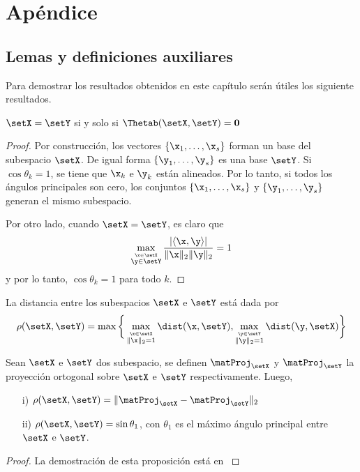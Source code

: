 	
	   \newpage
	
	\section*{Apéndice}
	\renewcommand{\thesubsection}{\arabic{subsection}}
	\setcounter{subsection}{0}
	
	\subsection{Lemas y definiciones auxiliares}
	
	Para demostrar los resultados obtenidos en este capítulo serán útiles los siguiente resultados.
	\begin{lemma}
		$\setX = \setY$ si y solo si $\Thetab(\setX,\setY) = \mathbf{0}$
	\end{lemma}
	\begin{proof}
		Por construcción, los vectores $\{\x_1,\ldots,\x_s\}$ forman un base del subespacio $\setX$. De igual forma $\{\y_1,\ldots,\y_s\}$ es una base $\setY$. Si $\cos\theta_k=1$, se tiene que $\x_k$ e $\y_k$ están alineados. Por lo tanto, si todos los ángulos principales son cero, los conjuntos  $\{\x_1,\ldots,\x_s\}$ y $\{\y_1,\ldots,\y_s\}$ generan el mismo subespacio.
		
		Por otro lado, cuando $\setX=\setY$, es claro que 
		\[\max_{\stackrel{\x\in\setX}{\y\in\setY}}\frac{|\langle\x,\y\rangle|}{\|\x\|_2\|\y\|_2} = 1\]
		y por lo tanto, $\cos\theta_k = 1$ para todo $k$.
	\end{proof}
	
	\begin{definition}
		La distancia entre los subespacios $\setX$ e $\setY$ está dada por
		\begin{equation}
			\rho(\setX,\setY) = \max\bigg\{\max_{\stackrel{\x\in\setX}{\|\x\|_2=1}}\dist(\x,\setY),\max_{\stackrel{\y\in\setY}{\|\y\|_2=1}}\dist(\y,\setX) \bigg\}
			\label{Eq:GapDistance}
		\end{equation}
	\end{definition}
	
	\begin{prop}\label{Prop:GapDistance}
		Sean $\setX$ e $\setY$ dos subespacio, se definen $\matProj_{\setX}$ y $\matProj_{\setY}$ la proyección ortogonal sobre $\setX$ e $\setY$ respectivamente. Luego,
		\begin{itemize}
			\item[i)] $\rho(\setX,\setY) = \|\matProj_{\setX}-\matProj_{\setY}\|_2$
			\item[ii)] $\rho(\setX,\setY)=\sin\theta_1$, con $\theta_1$ es el máximo ángulo principal entre $\setX$ e $\setY$.
		\end{itemize} 
	\end{prop}
	\begin{proof}
		La demostración de esta proposición está en \cite[Teorema 4.5]{Stewart1990}
	\end{proof}
	

	
	
	
	

